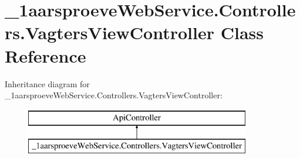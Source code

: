 \hypertarget{class__1aarsproeve_web_service_1_1_controllers_1_1_vagters_view_controller}{}\section{\+\_\+1aarsproeve\+Web\+Service.\+Controllers.\+Vagters\+View\+Controller Class Reference}
\label{class__1aarsproeve_web_service_1_1_controllers_1_1_vagters_view_controller}
Inheritance diagram for \+\_\+1aarsproeve\+Web\+Service.\+Controllers.\+Vagters\+View\+Controller\+:\begin{figure}[H]
\begin{center}
\leavevmode
\includegraphics[height=2.000000cm]{class__1aarsproeve_web_service_1_1_controllers_1_1_vagters_view_controller}
\end{center}
\end{figure}
